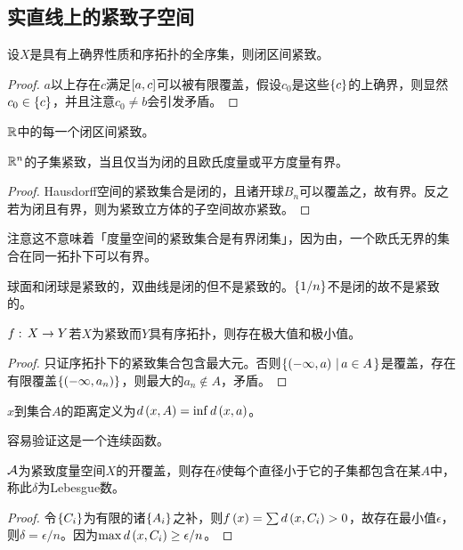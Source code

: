 \documentclass{ctexrep}
\begin{document}
  \subsection{实直线上的紧致子空间}
  \begin{theorem}
    设$X$是具有上确界性质和序拓扑的全序集，则闭区间紧致。
  \end{theorem}
  \begin{proof}
    $a$以上存在$c$满足$\left[a,c\right]$可以被有限覆盖，假设$c_0$是这些$\left\{c\right\}$的上确界，则显然$c_0\in\left\{c\right\}$，并且注意$c_0\neq b$会引发矛盾。
  \end{proof}
  \begin{corollary}
    $\mathbb{R}$中的每一个闭区间紧致。
  \end{corollary}
  \begin{theorem}
    $\mathbb{R}^n$的子集紧致，当且仅当为闭的且欧氏度量或平方度量有界。
  \end{theorem}
  \begin{proof}
    Hausdorff空间的紧致集合是闭的，且诸开球$B_n$可以覆盖之，故有界。反之若为闭且有界，则为紧致立方体的子空间故亦紧致。
  \end{proof}
  注意这不意味着「度量空间的紧致集合是有界闭集」，因为由，一个欧氏无界的集合在同一拓扑下可以有界。
  \begin{ex}
    球面和闭球是紧致的，双曲线是闭的但不是紧致的。$\left\{1/n\right\}$不是闭的故不是紧致的。
  \end{ex}
  \begin{theorem}[极值定理]
    \label{thm:extreme}
    $f:\, X \rightarrow Y$若$X$为紧致而$Y$具有序拓扑，则存在极大值和极小值。
  \end{theorem}
  \begin{proof}
    只证序拓扑下的紧致集合包含最大元。否则$\left\{\left(-\infty,a\right) \, \left| \, a\in A \right.\right\}$是覆盖，存在有限覆盖$\left\{\left(-\infty,a_n\right)\right\}$，则最大的$a_n\notin A$，矛盾。
  \end{proof}
  \begin{definition}
    $x$到集合$A$的距离定义为$d\left(x,A\right)=\inf {d\left(x,a\right)}$。
  \end{definition}
  容易验证这是一个连续函数。
  \begin{lemma}[Lebesgue数引理]
    $\mathcal{A}$为紧致度量空间$X$的开覆盖，则存在$\delta$使每个直径小于它的子集都包含在某$A$中，称此$\delta$为Lebesgue数。
  \end{lemma}
  \begin{proof}
    令$\left\{C_i\right\}$为有限的诸$\left\{A_i\right\}$之补，则$f\left(x\right)=\sum d\left(x,C_i\right)>0$，故存在最小值$\epsilon$，则$\delta=\epsilon/n$。因为$\max d\left(x,C_i\right)\ge \epsilon/n$。
  \end{proof}
\end{document}
